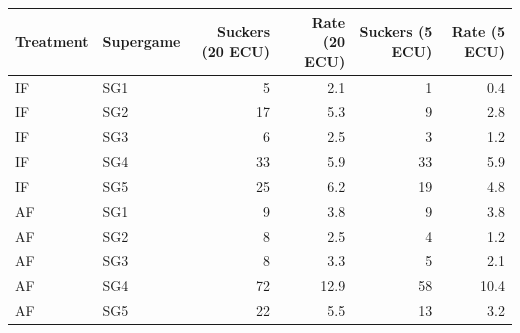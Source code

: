 \begin{tabular}{llrrrr}
  \toprule
  Treatment & Supergame & Suckers (20 ECU) & Rate (20 ECU) & Suckers (5 ECU) & Rate (5 ECU) \\ 
  \midrule
  IF & SG1 & 5 & 2.1 & 1 & 0.4 \\ 
  IF & SG2 & 17 & 5.3 & 9 & 2.8 \\ 
  IF & SG3 & 6 & 2.5 & 3 & 1.2 \\ 
  IF & SG4 & 33 & 5.9 & 33 & 5.9 \\ 
  IF & SG5 & 25 & 6.2 & 19 & 4.8 \\ 
  AF & SG1 & 9 & 3.8 & 9 & 3.8 \\ 
  AF & SG2 & 8 & 2.5 & 4 & 1.2 \\ 
  AF & SG3 & 8 & 3.3 & 5 & 2.1 \\ 
  AF & SG4 & 72 & 12.9 & 58 & 10.4 \\ 
  AF & SG5 & 22 & 5.5 & 13 & 3.2 \\ 
  \bottomrule
\end{tabular}
